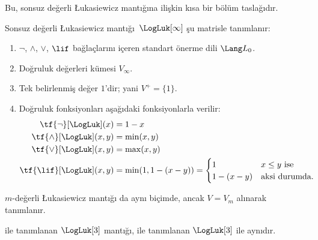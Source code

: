 



\begin{editorial}
  Bu, sonsuz değerli \L ukasiewicz mantığına ilişkin kısa bir bölüm
  taslağıdır.
\end{editorial}

\begin{defn} Sonsuz değerli \L ukasiewicz
mantığı~$\LogLuk[\infty]$ şu matrisle tanımlanır:
\begin{enumerate}
  \item $\lnot$, $\land$, $\lor$, $\lif$ bağlaçlarını içeren standart
  önerme dili $\Lang L_0$.
  \item Doğruluk değerleri kümesi $V_\infty$.
  \item Tek belirlenmiş değer $1$'dir; yani $V^+ = \{1\}$.
  \item Doğruluk fonksiyonları aşağıdaki fonksiyonlarla verilir:
  \begin{align*}
    \tf{\lnot}[\LogLuk](x) & = 1 - x\\
    \tf{\land}[\LogLuk](x,y) & = \min(x,y)\\
    \tf{\lor}[\LogLuk](x,y) & = \max(x,y)\\
    \tf{\lif}[\LogLuk](x,y) & = \min(1,1-(x-y)) = \begin{cases}
      1 & \text{$x \le y$ ise}\\
      1-(x-y) & \text{aksi durumda.}
    \end{cases}
    \end{align*}
\end{enumerate}
$m$-değerli \L ukasiewicz mantığı da aynı biçimde, ancak $V = V_m$
alınarak tanımlanır.
\end{defn}

\begin{prop}
   ile tanımlanan $\LogLuk[3]$ mantığı,
   ile tanımlanan $\LogLuk[3]$ ile aynıdır.
\end{prop}

